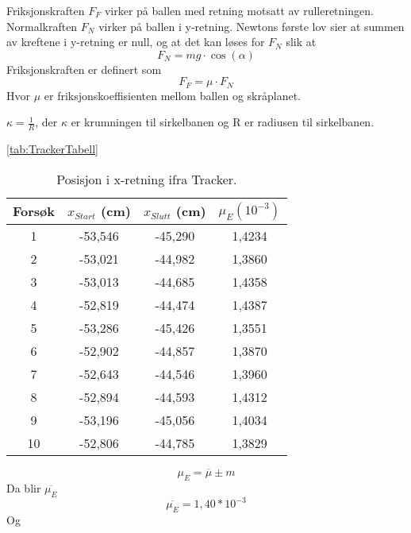 Friksjonskraften $F_{F}$ virker på ballen med retning motsatt av rulleretningen. Normalkraften $F_{N}$ virker på ballen i y-retning. Newtons første lov sier at summen av kreftene i y-retning er null, og at det kan løses for $F_{N}$ slik at
\begin{equation}
F_{N} = mg\cdot\cos(\alpha)
\end{equation}
Friksjonskraften er definert som 
\begin{equation}
F_{F} = \mu\cdot F_{N}
\end{equation}
Hvor $\mu$ er friksjonskoeffisienten mellom ballen og skråplanet. 

$\kappa = \frac{1}{R}$, der $\kappa$ er krumningen til sirkelbanen og R er radiusen til sirkelbanen.



\autoref{tab:TrackerTabell}
\FloatBarrier
 \begin{table}[h!]
 \begin{center}
 \begin{tabular}{c c c c}
 \hline
 Forsøk & $x_{Start}$ (cm) & $x_{Slutt}$ (cm) & $\mu_E (10^{-3})$ \\
 \hline

 1 & -53,546 & -45,290 & 1,4234\\ 
 2 & -53,021 & -44,982 & 1,3860\\
 3 & -53,013 & -44,685 & 1,4358\\
 4 & -52,819 & -44,474 & 1,4387\\
 5 & -53,286 & -45,426 & 1,3551\\
 6 & -52,902 & -44,857 & 1,3870\\
 7 & -52,643 & -44,546 & 1,3960\\
 8 & -52,894 & -44,593 & 1,4312\\
 9 & -53,196 & -45,056 & 1,4034\\
 10 & -52,806 & -44,785 & 1,3829\\[1ex]
 \hline
 
\end{tabular}
\end{center}
\caption{Posisjon i x-retning ifra Tracker.}
\label{tab:TrackerTabell}
\end{table}
\FloatBarrier


$$\mu_E = {\overline{\mu}}\pm m$$
Da blir $\overline{\mu_E}$
$$\overline{\mu_E} = 1,40 * 10^{-3}$$
Og



